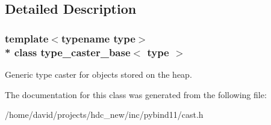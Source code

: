 \subsection{Detailed Description}
\subsubsection*{template$<$typename type$>$\\*
class type\+\_\+caster\+\_\+base$<$ type $>$}

Generic type caster for objects stored on the heap. 

The documentation for this class was generated from the following file\+:\begin{DoxyCompactItemize}
\item 
/home/david/projects/hdc\+\_\+new/inc/pybind11/cast.\+h\end{DoxyCompactItemize}

